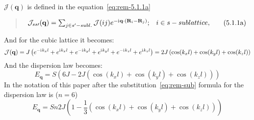     $\mathcal{J}(\mathbf{q})$ is defined in the equation~\eqref{eq:rem-5.1.1a}
    \begin{quote}
        \begin{equation}
            \begin{matrix}
                \mathcal{J}_{ss\prime}(\mathbf{q}) = \sum_{j \in s^{\prime} - subl.} \mathcal{J}(ij)e^{-\mathrm{i}\mkern1mu\mathbf{q}\cdot(\mathbf{R}_i - \mathbf{R}_j)}; & i \in s-sublattice,
            \end{matrix}  
            \label{eq:rem-5.1.1a} \tag{5.1.1a}
        \end{equation}
    \end{quote}
    And for the cubic lattice it becomes:
    \begin{equation}
        \mathcal{J}(\mathbf{q}) = J \left(e^{-\mathrm{i}\mkern1mu k_xl} + e^{\mathrm{i}\mkern1mu k_xl} + e^{-\mathrm{i}\mkern1mu k_yl} + e^{\mathrm{i}\mkern1mu k_yl} + e^{-\mathrm{i}\mkern1mu k_zl} + e^{\mathrm{i}\mkern1mu k_zl}\right) = 2J \left(\cos(k_xl) + \cos(k_yl) + \cos(k_zl)\right)
    \end{equation}
    And the dispersion law becomes:
    \begin{equation}
        E_{\mathbf{q}} = S(6J - 2J \left(\cos(k_xl) + \cos(k_yl) + \cos(k_zl)\right))
    \end{equation}
    In the notation of this paper after the substitution~\eqref{eq:rem-sub} formula for the dispersion law is ($n = 6$)
    \begin{equation}
        E_{\mathbf{q}} = Sn2J(1 - \dfrac{1}{3} \left(\cos(k_xl) + \cos(k_yl) + \cos(k_zl)\right))
    \end{equation}

     



